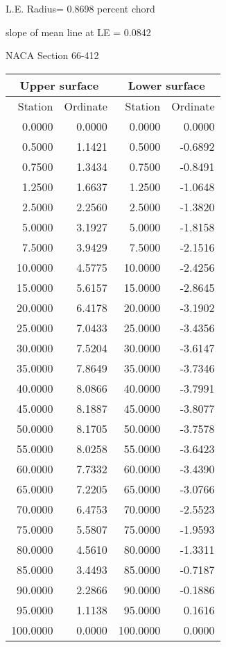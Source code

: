 \documentclass[11pt]{book}
\begin{document}
L.E. Radius=  0.8698 percent chord


 slope of mean line at LE =  0.0842
 \newpage
  \label{s66-412}
 \begin{Large}
 NACA Section 66-412
 \end{Large}
  
 \vspace{8mm}
 \begin{tabular}{|r|r|r|r|} \hline 
 \multicolumn{2}{|c|}{Upper surface} & \multicolumn{2}{|c|}{Lower surface} \\
 \hline
 Station & Ordinate & Station & Ordinate \\
 \hline
0.0000 & 0.0000 & 0.0000 & 0.0000 \\
0.5000 & 1.1421 & 0.5000 & -0.6892 \\
0.7500 & 1.3434 & 0.7500 & -0.8491 \\
1.2500 & 1.6637 & 1.2500 & -1.0648 \\
2.5000 & 2.2560 & 2.5000 & -1.3820 \\
5.0000 & 3.1927 & 5.0000 & -1.8158 \\
7.5000 & 3.9429 & 7.5000 & -2.1516 \\
10.0000 & 4.5775 & 10.0000 & -2.4256 \\
15.0000 & 5.6157 & 15.0000 & -2.8645 \\
20.0000 & 6.4178 & 20.0000 & -3.1902 \\
25.0000 & 7.0433 & 25.0000 & -3.4356 \\
30.0000 & 7.5204 & 30.0000 & -3.6147 \\
35.0000 & 7.8649 & 35.0000 & -3.7346 \\
40.0000 & 8.0866 & 40.0000 & -3.7991 \\
45.0000 & 8.1887 & 45.0000 & -3.8077 \\
50.0000 & 8.1705 & 50.0000 & -3.7578 \\
55.0000 & 8.0258 & 55.0000 & -3.6423 \\
60.0000 & 7.7332 & 60.0000 & -3.4390 \\
65.0000 & 7.2205 & 65.0000 & -3.0766 \\
70.0000 & 6.4753 & 70.0000 & -2.5523 \\
75.0000 & 5.5807 & 75.0000 & -1.9593 \\
80.0000 & 4.5610 & 80.0000 & -1.3311 \\
85.0000 & 3.4493 & 85.0000 & -0.7187 \\
90.0000 & 2.2866 & 90.0000 & -0.1886 \\
95.0000 & 1.1138 & 95.0000 & 0.1616 \\
100.0000 & 0.0000 & 100.0000 & 0.0000 \\
 \hline 
 \end{tabular}
\end{document}
